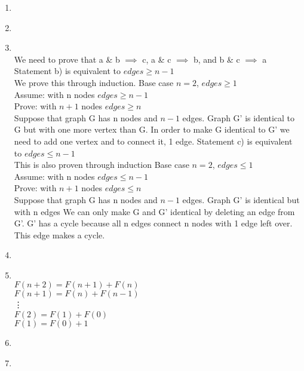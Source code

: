 \documentclass[11pt]{article}
\begin{document}
\begin{enumerate}
            \item \\
            \item \\
            \item \\
            We need to prove that a \& b $\implies$ c, a \& c $\implies$ b, and b \& c $\implies$ a\\
            \newline
            Statement b) is equivalent to $edges\geq n-1$\\
            We prove this through induction.  Base case $n=2$, $edges\geq1$\\
            Assume: with n nodes $edges\geq n-1$\\
            Prove: with $n+1$ nodes $edges\geq n$\\
            Suppose that graph G has n nodes and $n-1$ edges.  Graph G' is identical to G but with
            one more vertex than G.  In order to make G identical to G' we need to add one vertex and
            to connect it, 1 edge.
            \newline
            \newline
            Statement c) is equivalent to $edges\leq n-1$\\
            This is also proven through induction
            Base case $n=2$, $edges\leq1$\\
            Assume: with n nodes $edges\leq n-1$\\
            Prove: with $n+1$ nodes $edges\leq n$\\
            Suppose that graph G has n nodes and $n-1$ edges.  Graph G' is identical but with n edges
            We can only make G and G' identical by deleting an edge from G'.  G' has a cycle because all
            n edges connect n nodes with 1 edge left over.  This edge makes a cycle.
            \item \\
            \item \\
            $F(n+2) = F(n+1) + F(n)$\\
            $F(n+1) = F(n) + F(n-1)$\\
            \vdots\\
            $F(2) = F(1) + F(0)$\\
            $F(1) = F(0) + 1$\\
            \item \\
            \item \\
            
            \end{enumerate}

                                
\end{document}

